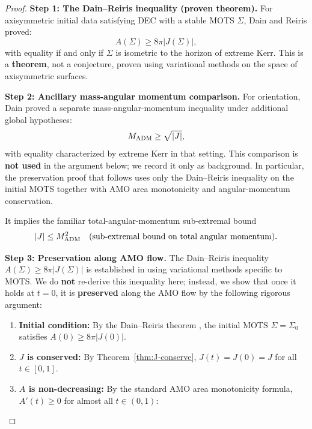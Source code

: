 \begin{proof}
\textbf{Step 1: The Dain--Reiris inequality (proven theorem).}
For axisymmetric initial data satisfying DEC with a stable MOTS $\Sigma$, Dain and Reiris \cite{dain2011} proved:
\[
A(\Sigma) \geq 8\pi|J(\Sigma)|,
\]
with equality if and only if $\Sigma$ is isometric to the horizon of extreme Kerr. This is a \textbf{theorem}, not a conjecture, proven using variational methods on the space of axisymmetric surfaces.

\textbf{Step 2: Ancillary mass-angular momentum comparison.}
For orientation, Dain \cite{dain2008} proved a separate mass-angular-momentum inequality under additional global hypotheses:
\[
M_{\mathrm{ADM}} \geq \sqrt{|J|},
\]
with equality characterized by extreme Kerr in that setting. This comparison is \textbf{not used} in the argument below; we record it only as background. In particular, the preservation proof that follows uses only the Dain--Reiris inequality on the initial MOTS together with AMO area monotonicity and angular-momentum conservation.
\medskip

\noindent It implies the familiar total-angular-momentum sub-extremal bound
\[
|J| \leq M_{\mathrm{ADM}}^2 \quad \text{(sub-extremal bound on total angular momentum)}.
\]

\textbf{Step 3: Preservation along AMO flow.}
The Dain--Reiris inequality $A(\Sigma) \geq 8\pi|J(\Sigma)|$ is established in \cite{dain2011} using variational methods specific to MOTS. We do \textbf{not} re-derive this inequality here; instead, we show that once it holds at $t = 0$, it is \textbf{preserved} along the AMO flow by the following rigorous argument:

\begin{enumerate}
    \item[(i)] \textbf{Initial condition:} By the Dain--Reiris theorem \cite{dain2011}, the initial MOTS $\Sigma = \Sigma_0$ satisfies $A(0) \geq 8\pi|J(0)|$.
    
    \item[(ii)] \textbf{$J$ is conserved:} By Theorem~\ref{thm:J-conserve}, $J(t) = J(0) = J$ for all $t \in [0, 1]$.
    
    \item[(iii)] \textbf{$A$ is non-decreasing:} By the standard AMO area monotonicity formula, $A'(t) \geq 0$ for almost all $t \in (0,1)$:
    

\end{enumerate}
\end{proof}
